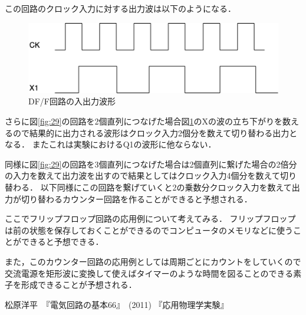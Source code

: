 \documentclass[11pt, a4paper,twocolumn]{jarticle}
\begin{document}
\newpage

この回路のクロック入力に対する出力波は以下のようになる．

\begin{figure}[htbp]
 \begin{center}
  \includegraphics[width=0.8\linewidth]{fig30.png}
 \end{center}
 \caption{DF/F回路の入出力波形}
 \label{fig:30}
\end{figure}

さらに図\ref{fig:29}の回路を2個直列につなげた場合図\ref{fig:30}のXの波の立ち下がりを数えるので結果的に出力される波形はクロック入力2個分を数えて切り替わる出力となる．
またこれは実験におけるQ1の波形に他ならない．

同様に図\ref{fig:29}の回路を3個直列につなげた場合は2個直列に繋げた場合の2倍分の入力を数えて出力波を出すので結果としてはクロック入力4個分を数えて切り替わる．
以下同様にこの回路を繋げていくと2の乗数分クロック入力を数えて出力が切り替わるカウンター回路を作ることができると予想される．

ここでフリップフロップ回路の応用例について考えてみる．
フリップフロップは前の状態を保存しておくことができるのでコンピュータのメモリなどに使うことができると予想できる．

また，このカウンター回路の応用例としては周期ごとにカウントをしていくので交流電源を矩形波に変換して使えばタイマーのような時間を図ることのできる素子を形成できることが予想される．


\begin{thebibliography}{99}
 松原洋平　『電気回路の基本66』　(2011)
 『応用物理学実験』
\end{thebibliography}
\end{document}
